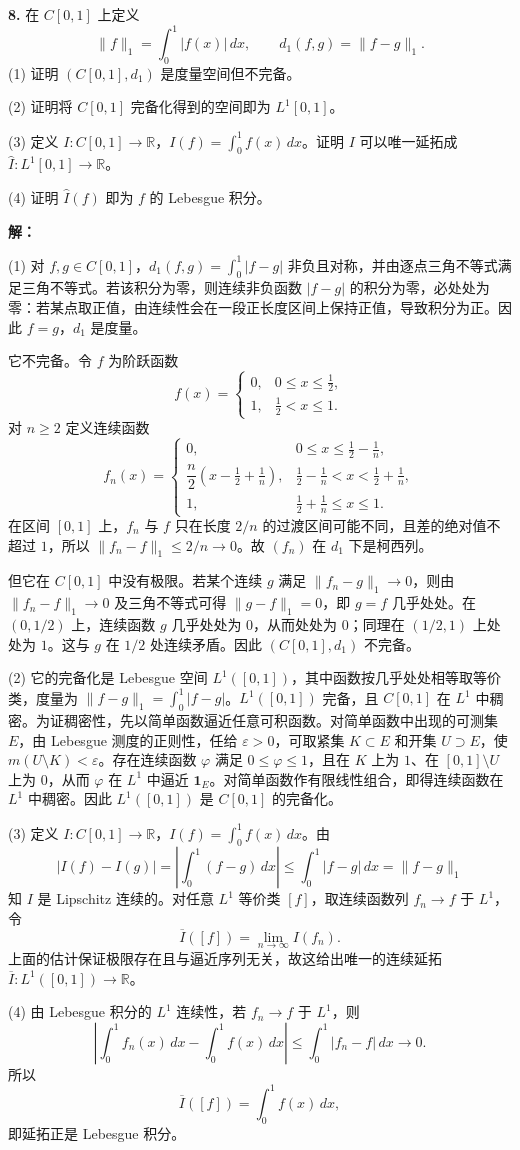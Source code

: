 \documentclass{article}
\begin{document}
\textbf{8.} 在 $C[0,1]$ 上定义
\[
\|f\|_1=\int_0^1|f(x)|\,dx,\qquad d_1(f,g)=\|f-g\|_1.
\]
(1) 证明 $(C[0,1],d_1)$ 是度量空间但不完备。

(2) 证明将 $C[0,1]$ 完备化得到的空间即为 $L^1[0,1]$。

(3) 定义 $I:C[0,1]\to\mathbb R$，$I(f)=\int_0^1f(x)\,dx$。证明 $I$ 可以唯一延拓成 $\widehat I:L^1[0,1]\to\mathbb R$。

(4) 证明 $\widehat I(f)$ 即为 $f$ 的 Lebesgue 积分。

\textbf{解：}

(1) 对 $f,g\in C[0,1]$，$d_1(f,g)=\int_0^1|f-g|$ 非负且对称，并由逐点三角不等式满足三角不等式。若该积分为零，则连续非负函数 $|f-g|$ 的积分为零，必处处为零：若某点取正值，由连续性会在一段正长度区间上保持正值，导致积分为正。因此 $f=g$，$d_1$ 是度量。

它不完备。令 $f$ 为阶跃函数
\[
f(x)=\begin{cases}0,&0\leq x\leq\tfrac12,\\1,&\tfrac12<x\leq1.\end{cases}
\]
对 $n\geq2$ 定义连续函数
\[
f_n(x)=\begin{cases}
0,&0\leq x\leq\tfrac12-\tfrac1n,\\
\dfrac n2\left(x-\tfrac12+\tfrac1n\right),&\tfrac12-\tfrac1n<x<\tfrac12+\tfrac1n,\\
1,&\tfrac12+\tfrac1n\leq x\leq1.
\end{cases}
\]
在区间 $[0,1]$ 上，$f_n$ 与 $f$ 只在长度 $2/n$ 的过渡区间可能不同，且差的绝对值不超过 $1$，所以 $\|f_n-f\|_1\leq2/n\to0$。故 $(f_n)$ 在 $d_1$ 下是柯西列。

但它在 $C[0,1]$ 中没有极限。若某个连续 $g$ 满足 $\|f_n-g\|_1\to0$，则由 $\|f_n-f\|_1\to0$ 及三角不等式可得 $\|g-f\|_1=0$，即 $g=f$ 几乎处处。在 $(0,1/2)$ 上，连续函数 $g$ 几乎处处为 $0$，从而处处为 $0$；同理在 $(1/2,1)$ 上处处为 $1$。这与 $g$ 在 $1/2$ 处连续矛盾。因此 $(C[0,1],d_1)$ 不完备。

(2) 它的完备化是 Lebesgue 空间 $L^1([0,1])$，其中函数按几乎处处相等取等价类，度量为
\(\|f-g\|_1=\int_0^1|f-g|\)。$L^1([0,1])$ 完备，且 $C[0,1]$ 在 $L^1$ 中稠密。为证稠密性，先以简单函数逼近任意可积函数。对简单函数中出现的可测集 $E$，由 Lebesgue 测度的正则性，任给 $\varepsilon>0$，可取紧集 $K\subset E$ 和开集 $U\supset E$，使 $m(U\setminus K)<\varepsilon$。存在连续函数 $\varphi$ 满足 $0\leq\varphi\leq1$，且在 $K$ 上为 $1$、在 $[0,1]\setminus U$ 上为 $0$，从而 $\varphi$ 在 $L^1$ 中逼近 $\mathbf 1_E$。对简单函数作有限线性组合，即得连续函数在 $L^1$ 中稠密。因此 $L^1([0,1])$ 是 $C[0,1]$ 的完备化。

(3) 定义 $I:C[0,1]\to\mathbb R$，$I(f)=\int_0^1f(x)\,dx$。由
\[
|I(f)-I(g)|=\left|\int_0^1(f-g)\,dx\right|
\leq\int_0^1|f-g|\,dx=\|f-g\|_1
\]
知 $I$ 是 Lipschitz 连续的。对任意 $L^1$ 等价类 $[f]$，取连续函数列 $f_n\to f$ 于 $L^1$，令
\[
\overline I([f])=\lim_{n\to\infty}I(f_n).
\]
上面的估计保证极限存在且与逼近序列无关，故这给出唯一的连续延拓 $\overline I:L^1([0,1])\to\mathbb R$。

(4) 由 Lebesgue 积分的 $L^1$ 连续性，若 $f_n\to f$ 于 $L^1$，则
\[
\left|\int_0^1f_n(x)\,dx-\int_0^1f(x)\,dx\right|
\leq\int_0^1|f_n-f|\,dx\longrightarrow0.
\]
所以
\[
\overline I([f])=\int_0^1f(x)\,dx,
\]
即延拓正是 Lebesgue 积分。
\end{document}
